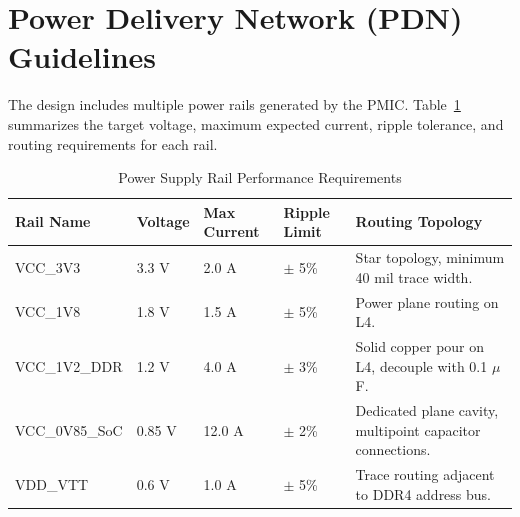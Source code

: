 \section{Power Delivery Network (PDN) Guidelines}
The design includes multiple power rails generated by the PMIC. Table~\ref{tab:power} summarizes the target voltage, maximum expected current, ripple tolerance, and routing requirements for each rail.

\begin{table}[h]
\centering
\fontsize{9}{11}\selectfont
\begin{tabularx}{\textwidth}{l l l l X}
\rowcolor{primary}
\color{white}\textbf{Rail Name} & \color{white}\textbf{Voltage} & \color{white}\textbf{Max Current} & \color{white}\textbf{Ripple Limit} & \color{white}\textbf{Routing Topology} \\
\midrule
VCC\_3V3 & 3.3 V & 2.0 A & $\pm$ 5\% & Star topology, minimum 40 mil trace width. \\
\rowcolor{lightbg}
VCC\_1V8 & 1.8 V & 1.5 A & $\pm$ 5\% & Power plane routing on L4. \\
VCC\_1V2\_DDR & 1.2 V & 4.0 A & $\pm$ 3\% & Solid copper pour on L4, decouple with 0.1 $\mu$F. \\
\rowcolor{lightbg}
VCC\_0V85\_SoC & 0.85 V & 12.0 A & $\pm$ 2\% & Dedicated plane cavity, multipoint capacitor connections. \\
VDD\_VTT & 0.6 V & 1.0 A & $\pm$ 5\% & Trace routing adjacent to DDR4 address bus. \\
\bottomrule
\end{tabularx}
\caption{Power Supply Rail Performance Requirements}
\label{tab:power}
\end{table}

